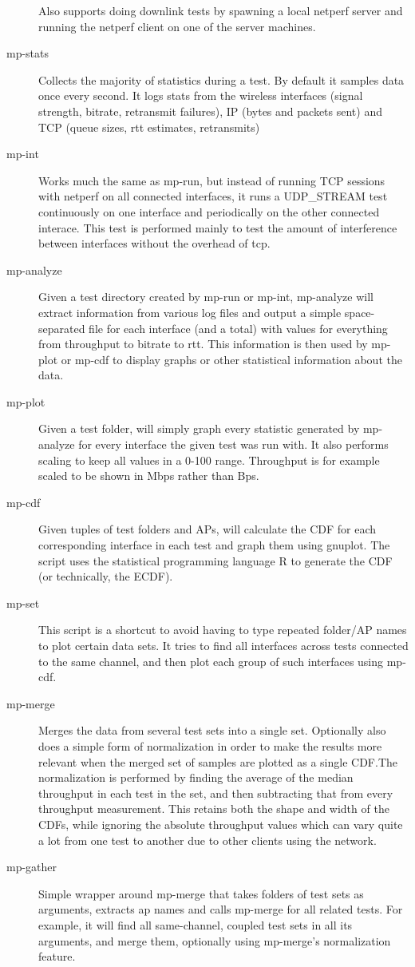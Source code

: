 \begin{description}
    Also supports doing downlink tests by spawning a local netperf server and
    running the netperf client on one of the server machines.
  \item[mp-stats]
    Collects the majority of statistics during a test. By default it samples
    data once every second. It logs stats from the wireless interfaces (signal
    strength, bitrate, retransmit failures), IP (bytes and packets sent) and TCP
    (queue sizes, rtt estimates, retransmits)
  \item[mp-int]
    Works much the same as mp-run, but instead of running TCP sessions with
    netperf on all connected interfaces, it runs a UDP\_STREAM test continuously
    on one interface and periodically on the other connected interace. This test
    is performed mainly to test the amount of interference between interfaces
    without the overhead of tcp.
  \item[mp-analyze]
    Given a test directory created by mp-run or mp-int, mp-analyze will extract
    information from various log files and output a simple space-separated file
    for each interface (and a total) with values for everything from throughput
    to bitrate to rtt. This information is then used by mp-plot or mp-cdf to
    display graphs or other statistical information about the data.
  \item[mp-plot]
    Given a test folder, will simply graph every statistic generated by
    mp-analyze for every interface the given test was run with. It also performs
    scaling to keep all values in a 0-100 range. Throughput is for example
    scaled to be shown in Mbps rather than Bps.
  \item[mp-cdf]
    Given tuples of test folders and APs, will calculate the CDF for each
    corresponding interface in each test and graph them using gnuplot. The
    script uses the statistical programming language R to generate the CDF (or
    technically, the ECDF).
  \item[mp-set]
    This script is a shortcut to avoid having to type repeated folder/AP
    names to plot certain data sets. It tries to find all interfaces across
    tests connected to the same channel, and then plot each group of such
    interfaces using mp-cdf.
  \item[mp-merge]
    Merges the data from several test sets into a single set. Optionally also
    does a simple form of normalization in order to make the results more
    relevant when the merged set of samples are plotted as a single CDF.\@ The
    normalization is performed by finding the average of the median throughput
    in each test in the set, and then subtracting that from every throughput
    measurement. This retains both the shape and width of the CDFs, while
    ignoring the absolute throughput values which can vary quite a lot from one
    test to another due to other clients using the network.
  \item[mp-gather]
    Simple wrapper around mp-merge that takes folders of test sets as arguments,
    extracts ap names and calls mp-merge for all related tests. For example, it
    will find all same-channel, coupled test sets in all its arguments, and
    merge them, optionally using mp-merge's normalization feature.
\end{description}
